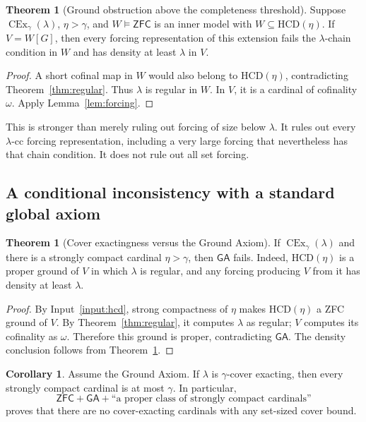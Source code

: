 \documentclass[11pt,letterpaper]{article}
\theoremstyle{definition}
\newtheorem{theorem}[definition]{Theorem}
\newtheorem{corollary}[definition]{Corollary}
\newcommand{\ZFC}{\mathsf{ZFC}}
\newcommand{\CEx}{\operatorname{CEx}}
\newcommand{\HCD}{\mathrm{HCD}}
\newcommand{\GA}{\mathsf{GA}}
\newcommand{\Cex}[2]{\CEx_{#1}(#2)}
\theoremstyle{remark}
\begin{document}
\begin{theorem}[Ground obstruction above the completeness threshold]\label{thm:ground}
Suppose $\Cex{\gamma}{\lambda}$, $\eta>\gamma$, and $W\models\ZFC$ is an inner model with $W\subseteq\HCD(\eta)$. If $V=W[G]$, then every forcing representation of this extension fails the $\lambda$-chain condition in $W$ and has density at least $\lambda$ in $V$.
\end{theorem}

\begin{proof}
A short cofinal map in $W$ would also belong to $\HCD(\eta)$, contradicting Theorem~\ref{thm:regular}. Thus $\lambda$ is regular in $W$. In $V$, it is a cardinal of cofinality $\omega$. Apply Lemma~\ref{lem:forcing}.
\end{proof}

This is stronger than merely ruling out forcing of size below $\lambda$. It rules out every $\lambda$-cc forcing representation, including a very large forcing that nevertheless has that chain condition. It does not rule out all set forcing.

\subsection{A conditional inconsistency with a standard global axiom}

\begin{theorem}[Cover exactingness versus the Ground Axiom]\label{thm:ga}
If $\Cex{\gamma}{\lambda}$ and there is a strongly compact cardinal $\eta>\gamma$, then $\GA$ fails. Indeed, $\HCD(\eta)$ is a proper ground of $V$ in which $\lambda$ is regular, and any forcing producing $V$ from it has density at least $\lambda$.
\end{theorem}

\begin{proof}
By Input~\ref{input:hcd}, strong compactness of $\eta$ makes $\HCD(\eta)$ a ZFC ground of $V$. By Theorem~\ref{thm:regular}, it computes $\lambda$ as regular; $V$ computes its cofinality as $\omega$. Therefore this ground is proper, contradicting $\GA$. The density conclusion follows from Theorem~\ref{thm:ground}.
\end{proof}

\begin{corollary}\label{cor:ga-global}
Assume the Ground Axiom. If $\lambda$ is $\gamma$-cover exacting, then every strongly compact cardinal is at most $\gamma$. In particular,
\[
 \ZFC+\GA+\text{``a proper class of strongly compact cardinals''}
\]
proves that there are no cover-exacting cardinals with any set-sized cover bound.
\end{corollary}
\end{document}
